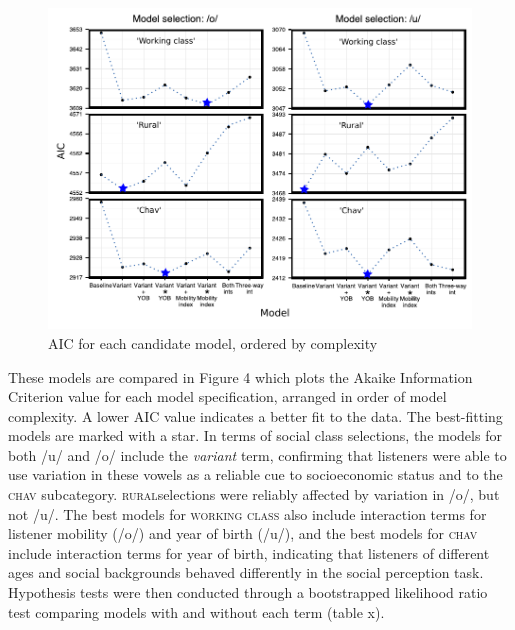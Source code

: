 \documentclass[PWPL]{article}
\begin{document}
\begin{figure}[ht]
\centering
\caption{AIC for each candidate model, ordered by complexity}
\includegraphics[scale=0.75]{model_comparison.pdf}
\end{figure}

 These models are compared in Figure 4 which plots the Akaike Information Criterion value for each model specification, arranged in order of model complexity. A lower AIC value indicates a better fit to the data. The best-fitting models are marked with a star. In terms of social class selections, the models for both /u/ and /o/ include the \textit{variant} term, confirming that listeners were able to use variation in these vowels as a reliable cue to socioeconomic status and to the \textsc{chav} subcategory. \textsc{rural}selections were reliably affected by variation in /o/, but not /u/. The best models for \textsc{working class} also include interaction terms for listener mobility (/o/) and year of birth (/u/), and the best models for \textsc{chav} include interaction terms for year of birth, indicating that listeners of different ages and social backgrounds behaved differently in the social perception task. Hypothesis tests were then conducted through a bootstrapped likelihood ratio test comparing models with and without each term (table x).
\end{document}
